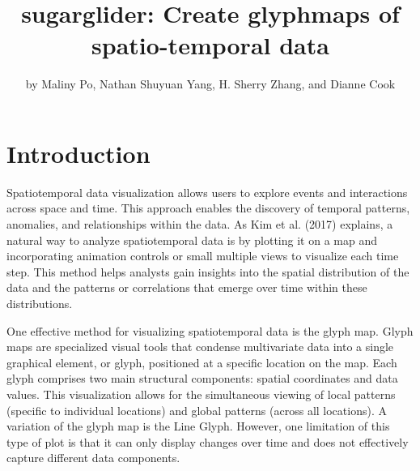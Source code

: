 \title{sugarglider: Create glyphmaps of spatio-temporal data}


\author{by Maliny Po, Nathan Shuyuan Yang, H. Sherry Zhang, and Dianne Cook}

\maketitle


\hypertarget{introduction}{%
\section{Introduction}\label{introduction}}

Spatiotemporal data visualization allows users to explore events and interactions across space and time. This approach enables the discovery of temporal patterns, anomalies, and relationships within the data. As Kim et al. (2017) explains, a natural way to analyze spatiotemporal data is by plotting it on a map and incorporating animation controls or small multiple views to visualize each time step. This method helps analysts gain insights into the spatial distribution of the data and the patterns or correlations that emerge over time within these distributions.

One effective method for visualizing spatiotemporal data is the glyph map. Glyph maps are specialized visual tools that condense multivariate data into a single graphical element, or glyph, positioned at a specific location on the map. Each glyph comprises two main structural components: spatial coordinates and data values. This visualization allows for the simultaneous viewing of local patterns (specific to individual locations) and global patterns (across all locations). A variation of the glyph map is the Line Glyph. However, one limitation of this type of plot is that it can only display changes over time and does not effectively capture different data components.

